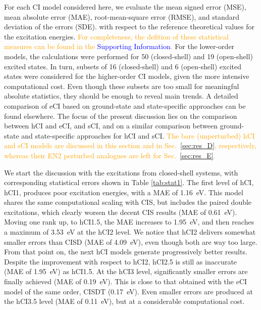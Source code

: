 \documentclass[aip,jcp,reprint,noshowkeys,superscriptaddress]{revtex4-1}
\newcommand{\fk}[1]{\textcolor{orange}{#1}}
\newcommand{\SupInf}{\textcolor{blue}{Supporting Information}}
\begin{document}
For each CI model considered here, we evaluate the mean signed error (MSE), mean absolute error (MAE), root-mean-square error (RMSE), and standard deviation of the errors (SDE).
with respect to the reference theoretical values for the excitation energies.
\fk{For completeness, the defition of these statistical measures can be found in the {\SupInf}.}
For the lower-order models, the calculations were performed for 50 (closed-shell) and 19 (open-shell) excited states.
In turn, subsets of 16 (closed-shell) and 6 (open-shell) excited states were considered for the higher-order CI models, given the more intensive computational cost.
Even though these subsets are too small for meaningful absolute statistics, they should be enough to reveal main trends.
A detailed comparison of eCI based on ground-state and state-specific approaches can be found elsewhere. \cite{Kossoski_2023}
The focus of the present discussion lies on the comparison between hCI and eCI, and sCI,
and on a similar comparison between ground-state and state-specific approaches for hCI and sCI.
\fk{The bare (unperturbed) hCI and sCI models are discussed in this section and in Sec.~\ref{sec:res_D}, respectively,
whereas their EN2 perturbed analogues are left for Sec.~\ref{sec:res_E}.}

We start the discussion with the excitations from closed-shell systems, with corresponding statistical errors shown in Table \ref{tab:stat1}.
The first level of hCI, hCI1, produces poor excitation energies, with a MAE of \SI{1.16}{\eV}.
This model shares the same computational scaling with CIS, but includes the paired double excitations,
which clearly worsen the decent CIS results (MAE of \SI{0.61}{\eV}).
Moving one rank up, to hCI1.5, the MAE increases to \SI{1.95}{\eV}, and then reaches a maximum of \SI{3.53}{\eV} at the hCI2 level.
We notice that hCI2 delivers somewhat smaller errors than CISD (MAE of \SI{4.09}{\eV}), even though both are way too large.
From that point on, the next hCI models generate progressively better results.
Despite the improvement with respect to hCI2, hCI2.5 is still as inaccurate (MAE of \SI{1.95}{\eV}) as hCI1.5.
At the hCI3 level, significantly smaller errors are finally achieved (MAE of \SI{0.19}{\eV}).
This is close to that obtained with the eCI model of the same order, CISDT (\SI{0.17}{\eV}).
Even smaller errors are produced at the hCI3.5 level (MAE of \SI{0.11}{\eV}), but at a considerable computational cost.
\end{document}
